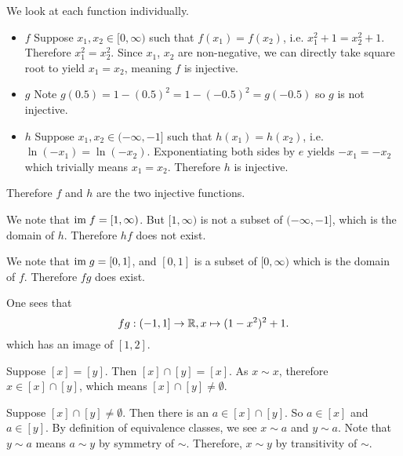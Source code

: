 \begin{questions}
    \item \begin{partquestions}{\alph*}
        \item We look at each function individually.
        \begin{itemize}
            \item $\boxed{f}$ Suppose $x_1,x_2 \in [0,\infty)$ such that $f(x_1) = f(x_2)$, i.e. $x_1^2 + 1 = x_2^2 + 1$. Therefore $x_1^2 = x_2^2$. Since $x_1$, $x_2$ are non-negative, we can directly take square root to yield $x_1 = x_2$, meaning $f$ is injective.
            \item $\boxed{g}$ Note $g(0.5) = 1-(0.5)^2 = 1 - (-0.5)^2 = g(-0.5)$ so $g$ is not injective.
            \item $\boxed{h}$ Suppose $x_1,x_2 \in (-\infty, -1]$ such that $h(x_1) = h(x_2)$, i.e. $\ln(-x_1) = \ln(-x_2)$. Exponentiating both sides by $e$ yields $-x_1 = -x_2$ which trivially means $x_1 = x_2$. Therefore $h$ is injective.
        \end{itemize}
        Therefore $f$ and $h$ are the two injective functions.

        \item We note that $\mathrm{im}\; f = [1, \infty)$. But $[1, \infty)$ is not a subset of $(-\infty, -1]$, which is the domain of $h$. Therefore $hf$ does not exist.

        \item We note that $\mathrm{im}\; g = [0, 1]$, and $[0, 1]$ is a subset of $[0, \infty)$ which is the domain of $f$. Therefore $fg$ does exist.

        One sees that
        \[
            fg: (-1, 1] \to \mathbb{R}, x \mapsto (1-x^2)^2 + 1.
        \]
        which has an image of $[1, 2]$.
    \end{partquestions}

    \item \begin{partquestions}{\alph*}
        \item Suppose $[x] = [y]$. Then $[x] \cap [y] = [x]$. As $x \sim x$, therefore $x \in [x] \cap [y]$, which means $[x] \cap [y] \neq \emptyset$.

        \item Suppose $[x] \cap [y] \neq \emptyset$. Then there is an $a \in [x] \cap [y]$. So $a \in [x]$ and $a \in [y]$. By definition of equivalence classes, we see $x \mathrel{\sim} a$ and $y \mathrel{\sim} a$. Note that $y \mathrel{\sim} a$ means $a \mathrel{\sim} y$ by symmetry of $\sim$. Therefore, $x \mathrel{\sim} y$ by transitivity of $\sim$.


\end{partquestions}
\end{questions}
